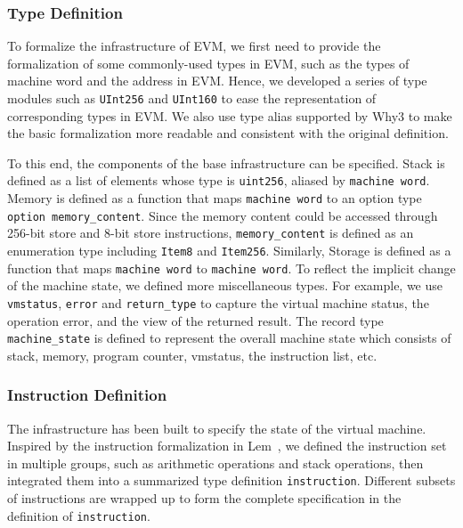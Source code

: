 \documentclass[runningheads]{llncs}
\begin{document}
\subsubsection{Type Definition}\label{sec:type}

To formalize the infrastructure of EVM, we first need to provide the formalization of some commonly-used types in EVM, such as the types of machine word and the address in EVM. Hence, we developed a series of type modules such as \texttt{UInt256} and \texttt{UInt160} to ease the representation of corresponding types in EVM. We also use type alias supported by Why3 to make the basic formalization more readable and consistent with the original definition. 

To this end, the components of the base infrastructure can be specified. Stack is defined as a list of elements whose type is \texttt{uint256}, aliased by \texttt{machine word}. Memory is defined as a function that maps \texttt{machine word} to an option type \texttt{option memory\_content}. Since the memory content could be accessed through 256-bit store and 8-bit store instructions, \texttt{memory\_content} is defined as an enumeration type including \texttt{Item8} and \texttt{Item256}. Similarly, Storage is defined as a function that maps \texttt{machine word} to \texttt{machine word}. To reflect the implicit change of the machine state, we defined more miscellaneous types. For example, we use \texttt{vmstatus}, \texttt{error} and \texttt{return\_type} to capture the virtual machine status, the operation error, and the view of the returned result. The record type \texttt{machine\_state} is defined to represent the overall machine state which consists of stack, memory, program counter, vmstatus, the instruction list, etc.

\subsubsection{Instruction Definition}\label{sec:instruction}
The infrastructure has been built to specify the state of the virtual machine. %
Inspired by the instruction formalization in Lem~\cite{hirai2017defining}, we defined the instruction set in multiple groups, such as arithmetic operations and stack operations, then integrated them into a summarized type definition \texttt{instruction}. %
Different subsets of instructions are wrapped up to form the complete specification in the definition of \texttt{instruction}.
\end{document}
